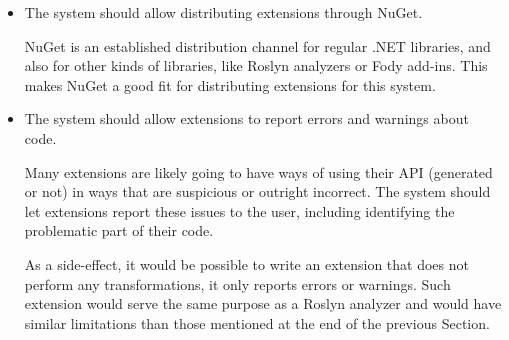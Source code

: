 \begin{itemize}
\item The system should allow distributing extensions through NuGet.

NuGet is an established distribution channel for regular .NET libraries, and also for other kinds of libraries, like Roslyn analyzers or Fody add-ins. This makes NuGet a good fit for distributing extensions for this system.

\item The system should allow extensions to report errors and warnings about code.

Many extensions are likely going to have ways of using their \ac{API} (generated or not) in ways that are suspicious or outright incorrect. The system should let extensions report these issues to the user, including identifying the problematic part of their code.

As a side-effect, it would be possible to write an extension that does not perform any transformations, it only reports errors or warnings. Such extension would serve the same purpose as a Roslyn analyzer and would have similar limitations than those mentioned at the end of the previous Section.



\end{itemize}